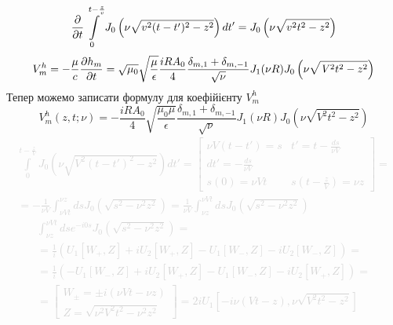%
\begin{equation} \begin{aligned}
\frac{\partial }{\partial t} \int \limits_{0}^{t - \frac{z}{v}} 
J_0 \left( \nu \sqrt{v^2 (t-t')^2 - z^2} \right) dt' =
J_0 \left( \nu \sqrt{v^2 t^2 - z^2} \right)
\end{aligned} \end{equation}
%
\textcolor{lightgray} { \begin{equation*} \begin{aligned}
V_m^h = - \frac{\mu}{c} \frac{\partial h_m}{\partial t} = 
\sqrt{\mu_0} \sqrt{\frac{\mu}{\epsilon}} \frac{iR A_0}{4} 
\frac{\delta_{m,1} + \delta_{m,-1}}{\sqrt{\nu}} J_1 (\nu R)
J_0 \left( \nu \sqrt{\mathit{V}^2 t^2 - z^2} \right)
\end{aligned} \end{equation*} }
%
Тепер можемо записати формулу для коефійієнту $ V_m^h $
%
\begin{equation}
V_m^h (z, t; \nu) = - \frac{iR A_0}{4} \sqrt{\frac{\mu_0 \mu}{\epsilon}} 
\frac{\delta_{m,1} + \delta_{m,-1}}{\sqrt{\nu}} J_1 (\nu R)
J_0 \left( \nu \sqrt{\mathit{V}^2 t^2 - z^2} \right)
\end{equation}
%
\textcolor{lightgray} { \begin{equation*} \begin{aligned}
\int \limits_{0}^{t - \frac{z}{\mathit{V}}} 
J_0 \left( \nu \sqrt{\mathit{V}^2 (t-t')^2 - z^2} 
\right) dt' = \left[ \begin{array}{cc} 
\nu \mathit{V} (t-t') = s & t' = t - \frac{ds}{\nu \mathit{V}} \\
dt' = -\frac{ds}{\nu \mathit{V}} & \\
s(0) = \nu \mathit{V} t & s \left( t - \frac{z}{\mathit{V}} \right) = \nu z
\end{array} \right] = \\ = - \frac{1}{\nu \mathit{V}} 
\int_{\nu \mathit{V} t}^{\nu z} ds 
J_0 (\sqrt{s^2 - \nu^2 z^2}) = \frac{1}{\nu \mathit{V}} 
\int_{\nu z}^{\nu \mathit{V} t} ds
J_0 (\sqrt{s^2 - \nu^2 z^2})
\end{aligned} \end{equation*} }
%
\textcolor{lightgray} { \begin{equation*} \begin{aligned}
\int_{\nu z}^{\nu \mathit{V} t} ds e^{-i0s} J_0 (\sqrt{s^2 - \nu^2 z^2}) = \\ 
= \frac{1}{i} (U_1[W_+,Z] + i U_2[W_+,Z] - U_1[W_-,Z] - i U_2[W_-,Z]) = \\
= \frac{1}{i} (-U_1[W_-,Z] + i U_2[W_+,Z] - U_1[W_-,Z] - i U_2[W_+,Z]) = \\
= \left[ \begin{array}{c} W_\pm = \pm i (\nu \mathit{V} t - \nu z) \\
Z = \sqrt{\nu^2 \mathit{V}^2 t^2 - \nu^2 z^2} \end{array} \right] = 
2i U_1 \left[ -i \nu (\mathit{V}t-z), \nu \sqrt{\mathit{V}^2 t^2-z^2} \right]
\end{aligned} \end{equation*} }
